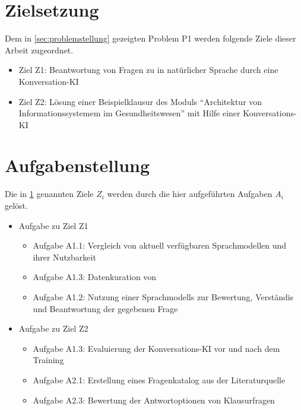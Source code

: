 \section{Zielsetzung}\label{sec:zielsetzung}

Dem in \ref{sec:problemstellung} gezeigten Problem P1 werden folgende Ziele dieser Arbeit zugeordnet.

\begin{itemize}
  \item Ziel Z1: Beantwortung von Fragen zu \citet{bb} in natürlicher Sprache durch eine Konversation-KI
  \item Ziel Z2: Lösung einer Beispielklausur des Moduls \enquote{Architektur von Informationssystemem im Gesundheitswesen} mit Hilfe einer Konversations-KI
\end{itemize}

\section{Aufgabenstellung}

Die in \ref{sec:zielsetzung} genannten Ziele $Z_i$ werden durch die hier aufgeführten Aufgaben $A_i$ gelöst.

\begin{itemize}
  \item Aufgabe zu Ziel Z1
  \begin{itemize}
    \item Aufgabe A1.1: Vergleich von aktuell verfügbaren Sprachmodellen und ihrer Nutzbarkeit
    \item Aufgabe A1.3: Datenkuration von \citet{bb}
    \item Aufgabe A1.2: Nutzung einer Sprachmodells zur Bewertung, Verständis und Beantwortung der gegebenen Frage
  \end{itemize}
  \item Aufgabe zu Ziel Z2
  \begin{itemize}
    \item Aufgabe A1.3: Evaluierung der Konversations-KI vor und nach dem Training
    \item Aufgabe A2.1: Erstellung eines Fragenkatalog aus der Literaturquelle
    \item Aufgabe A2.3: Bewertung der Antwortoptionen von Klausurfragen
  \end{itemize}
\end{itemize}

